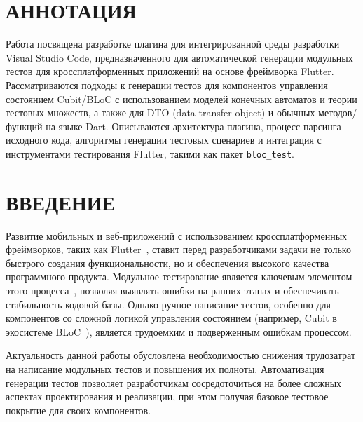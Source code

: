 \documentclass[14pt, russian]{scrartcl}
\newcommand{\anonsection}[1]{\cleardoublepage
\phantomsection
\addcontentsline{toc}{section}{\protect\numberline{}#1}
\section*{#1}\vspace*{2.5ex} %
}
\begin{document}
\section*{АННОТАЦИЯ}

Работа посвящена разработке плагина для интегрированной среды разработки Visual Studio Code, предназначенного для автоматической генерации модульных тестов для кроссплатформенных приложений на основе фреймворка Flutter. Рассматриваются подходы к генерации тестов для компонентов управления состоянием Cubit/BLoC с использованием моделей конечных автоматов и теории тестовых множеств, а также для DTO (data transfer object) и обычных методов/функций на языке Dart. Описываются архитектура плагина, процесс парсинга исходного кода, алгоритмы генерации тестовых сценариев и интеграция с инструментами тестирования Flutter, такими как пакет \texttt{bloc\_test}.


\newpage
\renewcommand\contentsname{\hfill{\normalfont{СОДЕРЖАНИЕ}}\hfill}
\tableofcontents
\newpage
\anonsection{ВВЕДЕНИЕ}

Развитие мобильных и веб-приложений с использованием кроссплатформенных фреймворков, таких как Flutter~\cite{FlutterDev}, ставит перед разработчиками задачи не только быстрого создания функциональности, но и обеспечения высокого качества программного продукта. Модульное тестирование является ключевым элементом этого процесса~\cite{FlutterTestingCookbook}, позволяя выявлять ошибки на ранних этапах и обеспечивать стабильность кодовой базы. Однако ручное написание тестов, особенно для компонентов со сложной логикой управления состоянием (например, Cubit в экосистеме BLoC~\cite{BlocLibraryTesting}), является трудоемким и подверженным ошибкам процессом.

Актуальность данной работы обусловлена необходимостью снижения трудозатрат на написание модульных тестов и повышения их полноты. Автоматизация генерации тестов позволяет разработчикам сосредоточиться на более сложных аспектах проектирования и реализации, при этом получая базовое тестовое покрытие для своих компонентов.
\end{document}
